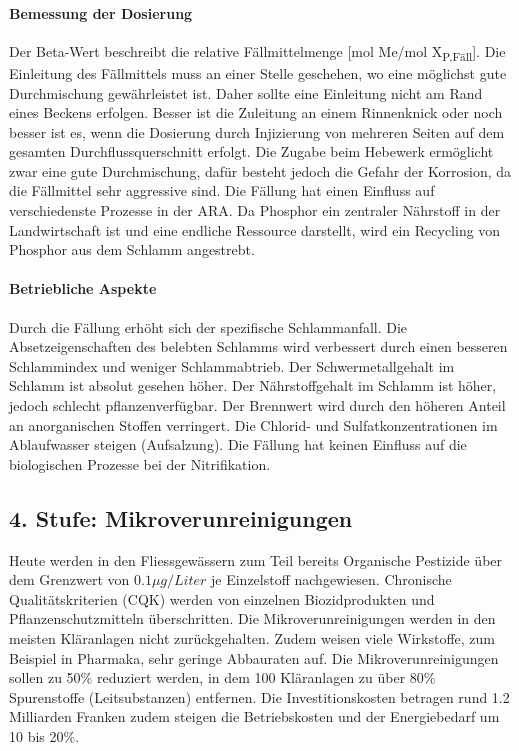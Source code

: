 \documentclass[9pt, openright=false]{scrartcl}
\begin{document}
\paragraph{Bemessung der Dosierung} Der  Beta-Wert beschreibt die relative Fällmittelmenge [mol Me/mol X\textsubscript{P,Fäll}]. Die Einleitung des Fällmittels muss an einer Stelle geschehen, wo eine möglichst gute Durchmischung gewährleistet ist. Daher sollte eine Einleitung nicht am Rand eines Beckens erfolgen. Besser ist die Zuleitung an einem Rinnenknick oder noch besser ist es, wenn die Dosierung durch Injizierung von mehreren Seiten auf dem gesamten Durchflussquerschnitt erfolgt. Die Zugabe beim Hebewerk ermöglicht zwar eine gute Durchmischung, dafür besteht jedoch die Gefahr der Korrosion, da die Fällmittel sehr aggressive sind. Die Fällung hat einen Einfluss auf verschiedenste Prozesse in der ARA. Da Phosphor ein zentraler Nährstoff in der Landwirtschaft ist und eine endliche Ressource darstellt, wird ein Recycling von Phosphor aus dem Schlamm angestrebt. 
\paragraph{Betriebliche Aspekte} Durch die Fällung erhöht sich der spezifische Schlammanfall. Die Absetzeigenschaften des belebten Schlamms wird verbessert durch einen besseren Schlammindex und weniger Schlammabtrieb. Der Schwermetallgehalt im Schlamm ist absolut gesehen höher. Der Nährstoffgehalt im Schlamm ist höher, jedoch schlecht pflanzenverfügbar. Der Brennwert wird durch den höheren Anteil an anorganischen Stoffen verringert. Die Chlorid- und Sulfatkonzentrationen im Ablaufwasser steigen (Aufsalzung). Die Fällung hat keinen Einfluss auf die biologischen Prozesse bei der Nitrifikation.
\subsection{4. Stufe: Mikroverunreinigungen}
Heute werden in den Fliessgewässern zum Teil bereits Organische Pestizide über dem Grenzwert von $0.1\mu g/ Liter$ je Einzelstoff nachgewiesen. Chronische Qualitätskriterien (CQK) werden von einzelnen Biozidprodukten und Pflanzenschutzmitteln überschritten. Die Mikroverunreinigungen werden in den meisten Kläranlagen nicht zurückgehalten. Zudem weisen viele Wirkstoffe, zum Beispiel in Pharmaka, sehr geringe Abbauraten auf. Die Mikroverunreinigungen sollen zu 50\% reduziert werden, in dem 100 Kläranlagen zu über 80\% Spurenstoffe (Leitsubstanzen) entfernen. Die Investitionskosten betragen rund 1.2 Milliarden Franken zudem steigen die Betriebskosten und der Energiebedarf um 10 bis 20\%. 
\end{document}
